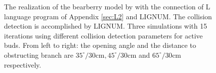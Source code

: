\begin{figure}
\caption{The realization of the bearberry model by \citet{salemaa:02}
with the connection of L language program of Appendix \ref{sec:L2} and
LIGNUM.   The collision  detection is  accomplished by  LIGNUM.  Three
simulations  with 15  iterations using  different  collision detection
parameters for active buds. From  left to right: the opening angle and
the  distance  to  obstructing branch  are  $35^{\circ}/30\mathrm{cm},
45^{\circ}/30\mathrm{cm}$        and        $65^{\circ}/30\mathrm{cm}$
respectively.}\label{fig:a-uva-ursi}
\end{figure}
